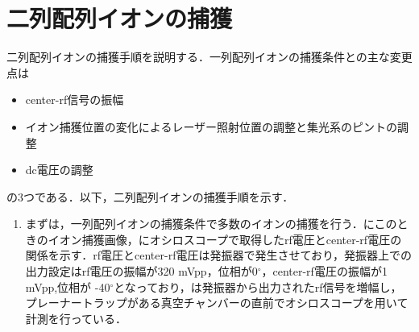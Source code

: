 \section{二列配列イオンの捕獲}
二列配列イオンの捕獲手順を説明する．一列配列イオンの捕獲条件との主な変更点は
\begin{itemize}
	\item center-rf信号の振幅
	\item イオン捕獲位置の変化によるレーザー照射位置の調整と集光系のピントの調整
	\item dc電圧の調整
\end{itemize}
の3つである．以下，二列配列イオンの捕獲手順を示す．\\
\begin{enumerate}
\item まずは，一列配列イオンの捕獲条件で多数のイオンの捕獲を行う．にこのときのイオン捕獲画像，にオシロスコープで取得したrf電圧とcenter-rf電圧の関係を示す．rf電圧とcenter-rf電圧は発振器で発生させており，発振器上での出力設定はrf電圧の振幅が320 mVpp，位相が0$^{\circ}$，center-rf電圧の振幅が1 mVpp,位相が -40$^{\circ}$となっており，は発振器から出力されたrf信号を増幅し，プレーナートラップがある真空チャンバーの直前でオシロスコープを用いて計測を行っている．


\end{enumerate}
